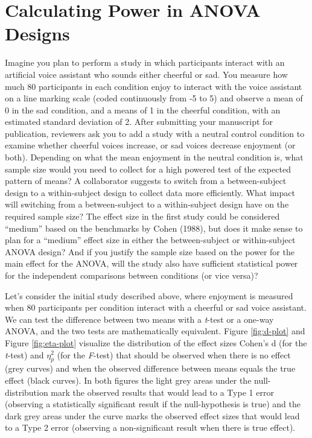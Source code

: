 \documentclass[
  ,jou,floatsintext]{apa6}
\begin{document}
\hypertarget{calculating-power-in-anova-designs}{%
\section{Calculating Power in ANOVA Designs}\label{calculating-power-in-anova-designs}}

Imagine you plan to perform a study in which participants interact with an artificial voice assistant who sounds either cheerful or sad.
You measure how much 80 participants in each condition enjoy to interact with the voice assistant on a line marking scale (coded continuously from -5 to 5) and observe a mean of 0 in the sad condition, and a means of 1 in the cheerful condition, with an estimated standard deviation of 2.
After submitting your manuscript for publication, reviewers ask you to add a study with a neutral control condition to examine whether cheerful voices increase, or sad voices decrease enjoyment (or both).
Depending on what the mean enjoyment in the neutral condition is, what sample size would you need to collect for a high powered test of the expected pattern of means?
A collaborator suggests to switch from a between-subject design to a within-subject design to collect data more efficiently.
What impact will switching from a between-subject to a within-subject design have on the required sample size?
The effect size in the first study could be considered \enquote{medium} based on the benchmarks by Cohen (1988), but does it make sense to plan for a \enquote{medium} effect size in either the between-subject or within-subject ANOVA design?
And if you justify the sample size based on the power for the main effect for the ANOVA, will the study also have sufficient statistical power for the independent comparisons between conditions (or vice versa)?

Let's consider the initial study described above, where enjoyment is measured when 80 participants per condition interact with a cheerful or sad voice assistant.
We can test the difference between two means with a \emph{t}-test or a one-way ANOVA, and the two tests are mathematically equivalent.
Figure \ref{fig:d-plot} and Figure \ref{fig:eta-plot} visualize the distribution of the effect sizes Cohen's d (for the \emph{t}-test) and \(\eta_p^2\) (for the \emph{F}-test) that should be observed when there is no effect (grey curves) and when the observed difference between means equals the true effect (black curves).
In both figures the light grey areas under the null-distribution mark the observed results that would lead to a Type 1 error (observing a statistically significant result if the null-hypothesis is true) and the dark grey areas under the curve marks the observed effect sizes that would lead to a Type 2 error (observing a non-significant result when there is true effect).
\end{document}
